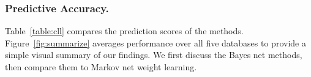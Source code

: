 \documentclass[twoside,leqno,twocolumn]{article}
\begin{document}
\begin{table}[t]
\caption{A comparison of {\em runtime} (seconds) required for parameter learning with a fixed Bayes net structure. 
Database sizes are specified by the number of tuples and the number of ground atoms. 
}
\begin{center}
\begin{large}
\end{large}
\end{center}
\label{table:learn-times}
\end{table}%
\subsubsection{Predictive Accuracy.} Table~\ref{table:cll} compares the prediction scores of the methods.
Figure~\ref{fig:summarize} averages performance over all five databases to provide a simple visual summary of our findings. 
We first discuss the Bayes net methods, then compare them to Markov net weight learning.
\end{document}
